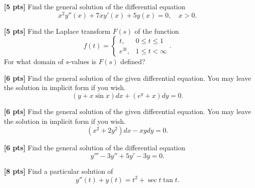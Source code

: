 \documentclass[11pt]{article}
\begin{document}
\begin{problem}
\textbf{[5 pts]} Find the general solution of the differential equation 
\begin{equation*}
 x ^{2} y'' (x)+7xy' (x)+5y(x) = 0,\quad  x > 0.
\end{equation*}
\end{problem}



\begin{problem}
\textbf{[5 pts]} Find the Laplace transform $F (s)$ of the function
\begin{equation*}
 f(t) = \left\{\begin{array}{ll}t, & 0\leq t\leq 1 \\ e^{3t}, & 1\leq t<\infty \end{array}\right. .
\end{equation*}
For what domain of $s$-values is $F (s)$ defined?
\end{problem}



\begin{problem}
\textbf{[6 pts]} Find the general solution of the given differential equation. You may leave the solution in
implicit form if you wish.
\begin{equation*}
(y + x \sin x) dx + (e^{ y} + x) dy = 0 .
\end{equation*}
\end{problem}



\begin{problem}
\textbf{[6 pts]} Find the general solution of the given differential equation. You may leave the solution in
implicit form if you wish.
\begin{equation*}
 (x ^{2} + 2y ^{2}) dx − xydy = 0 .
\end{equation*}
\end{problem}



\begin{problem}
\textbf{[6 pts]} Find the general solution of the differential equation
\begin{equation*}
y''' − 3y'' + 5y' − 3y = 0.
\end{equation*}
\end{problem}



\begin{problem}
\textbf{[8 pts]} Find a particular solution of
\begin{equation*}
 y'' (t) + y(t) = t^{ 2} + \sec t \tan t .
\end{equation*}
\end{problem}
\end{document}
